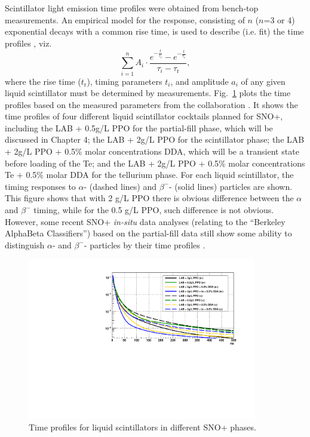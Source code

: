 Scintillator light emission time profiles were obtained from bench-top measurements. An empirical model for the response, consisting of $n$ ($n$=3 or 4) exponential decays with a common rise time, is used to describe (i.e. fit) the time profiles \cite{biller2020slow}, viz.
\begin{equation}
\sum^{n}_{i=1}A_i\cdot\frac{e^{-\frac{t}{\tau_i}}-e^{-\frac{t}{\tau_{\mathrm{r}}}}}{\tau_i-\tau_{\mathrm{r}}},
\end{equation}
where the rise time ($t_{\mathrm{r}}$), timing parameters $t_i$, and amplitude $a_i$ of any given liquid scintillator must be determined by measurements. Fig.~\ref{fig:allTiming} plots the time profiles based on the measured parameters from the collaboration \cite{chicagoTiming,tanner0p5,tannerTeDDA,joshW1}. It shows the time profiles of four different liquid scintillator cocktails planned for SNO+, including the LAB + 0.5g/L PPO for the partial-fill phase, which will be discussed in Chapter 4; the LAB + 2g/L PPO for the scintillator phase; the LAB + 2g/L PPO + 0.5\% molar concentrations DDA, which will be a transient state before loading of the Te; and the LAB + 2g/L PPO + 0.5\% molar concentrations Te + 0.5\% molar DDA for the tellurium phase. For each liquid scintillator, the timing responses to $\alpha$- (dashed lines) and $\beta^-$- (solid lines) particles are shown. This figure shows that with 2 g/L PPO there is obvious difference between the $\alpha$ and $\beta^-$ timing, while for the 0.5 g/L PPO, such difference is not obvious. However, some recent SNO+ \emph{in-situ} data analyses (relating to the ``Berkeley AlphaBeta Classifiers'') based on the partial-fill data still show some ability to distinguish $\alpha$- and $\beta^-$- particles by their time profiles \cite{maxSmileyBerkeleyAlphaBeta}. 

\begin{figure}[!htb]
	\centering
	\includegraphics[width=10cm]{plotAllTiming.pdf}
	\caption{Time profiles for liquid scintillators in different SNO+ phases.}
	\label{fig:allTiming}
\end{figure}

